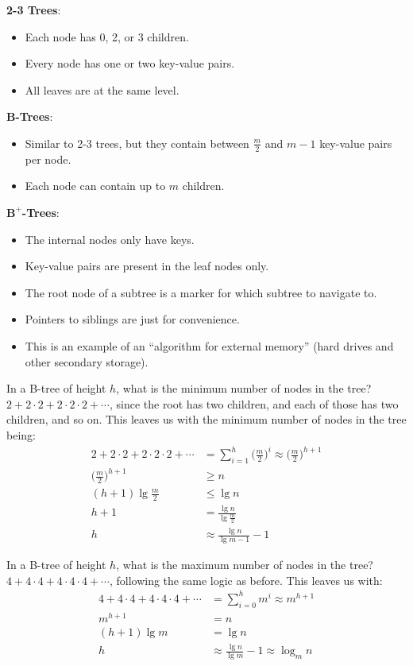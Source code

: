 \documentclass[]{article}
\theoremstyle{definition}
\begin{document}
			\textbf{2-3 Trees}:
			\begin{itemize}
				\item Each node has 0, 2, or 3 children.
				\item Every node has one or two key-value pairs.
				\item All leaves are at the same level.
			\end{itemize}

			\textbf{B-Trees}:
			\begin{itemize}
				\item Similar to 2-3 trees, but they contain between $\frac{m}{2}$ and $m - 1$ key-value pairs per node.
				\item Each node can contain up to $m$ children.
			\end{itemize}

			\textbf{$\boldsymbol{B^+}$-Trees}:
			\begin{itemize}
				\item The internal nodes only have keys.
				\item Key-value pairs are present in the leaf nodes only.
				\item The root node of a subtree is a marker for which subtree to navigate to.
				\item Pointers to siblings are just for convenience.
				\item This is an example of an ``algorithm for external memory'' (hard drives and other secondary storage).
			\end{itemize}

			In a B-tree of height $h$, what is the minimum number of nodes in the tree? $2 + 2 \cdot 2 + 2 \cdot 2 \cdot 2 + \cdots$, since the root has two children, and each of those has two children, and so on. This leaves us with the minimum number of nodes in the tree being:
			\begin{align*}
				2 + 2 \cdot 2 + 2 \cdot 2 \cdot 2 + \cdots &= \sum_{i = 1}^{h} \bigg(\frac{m}{2}\bigg)^i \approx \bigg(\frac{m}{2}\bigg)^{h + 1} \\
				\bigg(\frac{m}{2}\bigg)^{h + 1} &\ge n \\
				(h + 1) \lg\frac{m}{2} &\le \lg n \\
				h + 1 &= \frac{\lg n}{\lg \frac{m}{2}} \\
				h &\approx \frac{\lg n}{\lg m - 1} - 1
			\end{align*}

			In a B-tree of height $h$, what is the maximum number of nodes in the tree? $4 + 4 \cdot 4 + 4 \cdot 4 \cdot 4 + \cdots$, following the same logic as before. This leaves us with:
			\begin{align*}
				4 + 4 \cdot 4 + 4 \cdot 4 \cdot 4 + \cdots &= \sum_{i = 0}^{h} m^i \approx m^{h + 1} \\
				m^{h + 1} &= n \\
				(h + 1) \lg m &= \lg n \\
				h &\approx \frac{\lg n}{\lg m} - 1 \approx \log_m n
			\end{align*}
\end{document}
